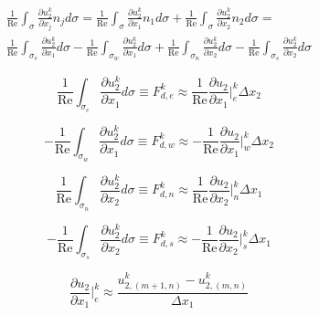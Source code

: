 \documentclass[10pt, letterpaper]{article}
\begin{document}
\begin{multline}
  \frac{1}{\text{Re}}\int_{\sigma}\frac{\partial{u_{2}^{k}}}{\partial{x_{j}}}n_{j}d\sigma =
  \frac{1}{\text{Re}}\int_{\sigma}\frac{\partial{u_{2}^{k}}}{\partial{x_{1}}}n_{1}d\sigma + \frac{1}{\text{Re}}\int_{\sigma}\frac{\partial{u_{2}^{k}}}{\partial{x_{2}}}n_{2}d\sigma = \\
  \frac{1}{\text{Re}}\int_{\sigma_{e}}\frac{\partial{u_{2}^{k}}}{\partial{x_{1}}}d\sigma - \frac{1}{\text{Re}}\int_{\sigma_{w}}\frac{\partial{u_{2}^{k}}}{\partial{x_{1}}}d\sigma + \frac{1}{\text{Re}}\int_{\sigma_{n}}\frac{\partial{u_{2}^{k}}}{\partial{x_{2}}}d\sigma - \frac{1}{\text{Re}}\int_{\sigma_{s}}\frac{\partial{u_{2}^{k}}}{\partial{x_{2}}}d\sigma
  \label{eq:u2_Fd_int}
\end{multline}

\begin{equation}
  \frac{1}{\text{Re}}\int_{\sigma_{e}}\frac{\partial{u_{2}^{k}}}{\partial{x_{1}}}d\sigma \equiv
  F_{d,e}^{k} \approx \frac{1}{\text{Re}}\frac{\partial{u_{2}}}{\partial{x_{1}}}\bigg|_{e}^{k}\Delta{x_{2}}
  \label{eq:u2_Fde}
\end{equation}

\begin{equation}
  - \frac{1}{\text{Re}}\int_{\sigma_{w}}\frac{\partial{u_{2}^{k}}}{\partial{x_{1}}}d\sigma \equiv
  F_{d,w}^{k} \approx - \frac{1}{\text{Re}}\frac{\partial{u_{2}}}{\partial{x_{1}}}\bigg|_{w}^{k}\Delta{x_{2}}
  \label{eq:u2_Fdw}
\end{equation}

\begin{equation}
  \frac{1}{\text{Re}}\int_{\sigma_{n}}\frac{\partial{u_{2}^{k}}}{\partial{x_{2}}}d\sigma \equiv
  F_{d,n}^{k} \approx \frac{1}{\text{Re}}\frac{\partial{u_{2}}}{\partial{x_{2}}}\bigg|_{n}^{k}\Delta{x_{1}}
  \label{eq:u2_Fdn}
\end{equation}

\begin{equation}
  - \frac{1}{\text{Re}}\int_{\sigma_{s}}\frac{\partial{u_{2}^{k}}}{\partial{x_{2}}}d\sigma \equiv
  F_{d,s}^{k} \approx - \frac{1}{\text{Re}}\frac{\partial{u_{2}}}{\partial{x_{2}}}\bigg|_{s}^{k}\Delta{x_{1}}
  \label{eq:u2_Fds}
\end{equation}

\begin{equation}
  \frac{\partial{u_{2}}}{\partial{x_{1}}}\bigg|_{e}^{k}\approx
  \frac{u_{2,(m+1,n)}^{k} - u_{2,(m,n)}^{k}}{\Delta{x_{1}}}
  \label{eq:u2_du2dx1_e}
\end{equation}
\end{document}
